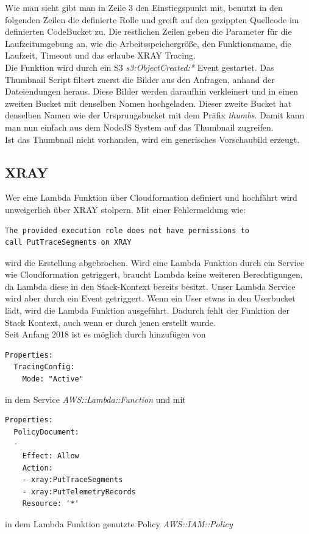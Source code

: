 \documentclass[a4paper, 12pt]{scrreprt}
\renewcommand\_{\textunderscore\allowbreak}
\begin{document}
Wie man sieht gibt man in Zeile 3 den Einstiegspunkt mit, benutzt in den folgenden Zeilen die definierte Rolle und greift auf den gezippten Quellcode im definierten CodeBucket zu. Die restlichen Zeilen geben die Parameter für die Laufzeitumgebung an, wie die Arbeitsspeichergröße, den Funktionsname, die Laufzeit, Timeout und das erlaube XRAY Tracing.\\

Die Funktion wird durch ein S3 \textit{s3:ObjectCreated:*} Event gestartet. Das Thumbnail Script filtert zuerst die Bilder aus den Anfragen, anhand der Dateiendungen heraus. Diese Bilder werden daraufhin verkleinert und in einen zweiten Bucket mit denselben Namen hochgeladen. Dieser zweite Bucket hat denselben Namen wie der Ursprungsbucket mit dem Präfix \textit{thumbs}. Damit kann man nun einfach aus dem NodeJS System auf das Thumbnail zugreifen. \\
Ist das Thumbnail nicht vorhanden, wird ein generisches Vorschaubild erzeugt. 
\subsection{XRAY}
Wer eine Lambda Funktion über Cloudformation definiert und hochfährt wird unweigerlich über XRAY stolpern. Mit einer Fehlermeldung wie: 
\begin{lstlisting}
The provided execution role does not have permissions to
call PutTraceSegments on XRAY
\end{lstlisting}
wird die Erstellung abgebrochen. Wird eine Lambda Funktion durch ein Service wie Cloudformation getriggert, braucht Lambda keine weiteren Berechtigungen, da Lambda diese in den Stack-Kontext bereits besitzt. Unser Lambda Service wird aber durch ein Event getriggert. Wenn ein User etwas in den Userbucket lädt, wird die Lambda Funktion ausgeführt. Dadurch fehlt der Funktion der Stack Kontext, auch wenn er durch jenen erstellt wurde. \\
Seit Anfang 2018 \cite{AWSDe} ist es möglich durch hinzufügen von
\begin{lstlisting}
Properties:
  TracingConfig:
    Mode: "Active"
\end{lstlisting} 
in dem Service \textit{AWS::Lambda::Function} und mit 
\begin{lstlisting}
Properties:
  PolicyDocument:
  -
    Effect: Allow
    Action:
    - xray:PutTraceSegments
    - xray:PutTelemetryRecords
    Resource: '*'
\end{lstlisting} 
in dem Lambda Funktion genutzte Policy \textit{AWS::IAM::Policy}
\end{document}
